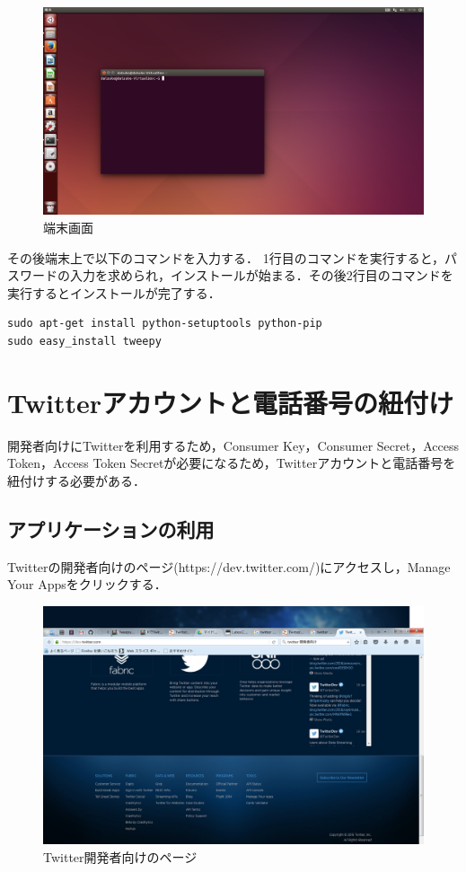 \begin{figure}[H]
\centering
\includegraphics[width=15cm]{tweepyinstall002.png}
\caption{端末画面}\label{Ubuntu端末画面}
\end{figure}

その後端末上で以下のコマンドを入力する．
1行目のコマンドを実行すると，パスワードの入力を求められ，インストールが始まる．その後2行目のコマンドを実行するとインストールが完了する．
\begin{lstlisting}
sudo apt-get install python-setuptools python-pip
sudo easy_install tweepy
\end{lstlisting}


\section{Twitterアカウントと電話番号の紐付け}

開発者向けにTwitterを利用するため，Consumer Key，Consumer Secret，Access Token，Access Token Secretが必要になるため，Twitterアカウントと電話番号を紐付けする必要がある．

\subsection{アプリケーションの利用}
Twitterの開発者向けのページ(https://dev.twitter.com/)にアクセスし，Manage Your Appsをクリックする．

\begin{figure}[H]
\centering
\includegraphics[width=15cm]{twitterdev001.png}
\caption{Twitter開発者向けのページ}\label{Twitter開発者向けページ}
\end{figure}

